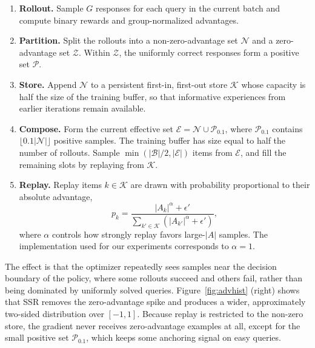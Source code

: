 \documentclass{article}
\begin{document}
\begin{enumerate}[leftmargin=*]
    \item \textbf{Rollout.} Sample $G$ responses for each query in the current batch and compute binary rewards and group-normalized advantages.
    \item \textbf{Partition.} Split the rollouts into a non-zero-advantage set $\mathcal{N}$ and a zero-advantage set $\mathcal{Z}$. Within $\mathcal{Z}$, the uniformly correct responses form a positive set $\mathcal{P}$.
    \item \textbf{Store.} Append $\mathcal{N}$ to a persistent first-in, first-out store $\mathcal{K}$ whose capacity is half the size of the training buffer, so that informative experiences from earlier iterations remain available.
    \item \textbf{Compose.} Form the current effective set $\mathcal{E}=\mathcal{N}\cup\mathcal{P}_{0.1}$, where $\mathcal{P}_{0.1}$ contains $\lfloor 0.1|\mathcal{N}|\rfloor$ positive samples. The training buffer has size equal to half the number of rollouts. Sample $\min(|\mathcal{B}|/2, |\mathcal{E}|)$ items from $\mathcal{E}$, and fill the remaining slots by replaying from $\mathcal{K}$.
    \item \textbf{Replay.} Replay items $k\in\mathcal{K}$ are drawn with probability proportional to their absolute advantage,
    \begin{equation}
        p_k = \frac{|A_k|^{\alpha} + \epsilon'}{\sum_{k'\in\mathcal{K}} \left(|A_{k'}|^{\alpha} + \epsilon'\right)},
    \end{equation}
    where $\alpha$ controls how strongly replay favors large-$|A|$ samples. The implementation used for our experiments corresponds to $\alpha=1$.
\end{enumerate}

The effect is that the optimizer repeatedly sees samples near the decision boundary of the policy, where some rollouts succeed and others fail, rather than being dominated by uniformly solved queries. Figure~\ref{fig:advhist} (right) shows that SSR removes the zero-advantage spike and produces a wider, approximately two-sided distribution over $[-1,1]$. Because replay is restricted to the non-zero store, the gradient never receives zero-advantage examples at all, except for the small positive set $\mathcal{P}_{0.1}$, which keeps some anchoring signal on easy queries.
\end{document}
